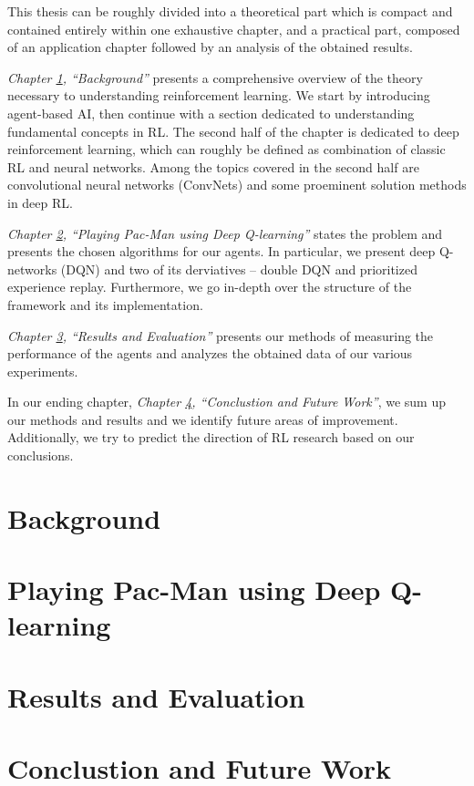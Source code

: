 \documentclass[12pt,twoside]{report}
\begin{document}
This thesis can be roughly divided into a theoretical part which is compact and contained entirely within one exhaustive chapter, and a practical part, composed of an application chapter followed by an analysis of the obtained results.

\emph{Chapter \ref{chapter:background}, ``Background''} presents a comprehensive overview of the theory necessary to understanding reinforcement learning.
We start by introducing agent-based AI, then continue with a
section dedicated to understanding fundamental concepts in RL.
The second half of the chapter is dedicated to deep reinforcement learning, which can roughly be defined as combination of classic RL and neural networks.
Among the topics covered in the second half are convolutional neural networks (ConvNets) and some proeminent solution methods in deep RL.

\emph{Chapter \ref{chapter:practical}, ``Playing Pac-Man using Deep Q-learning''} states the problem and presents the chosen algorithms for our agents.
In particular, we present deep Q-networks (DQN) and two of its derviatives -- double DQN and prioritized experience replay.
Furthermore, we go in-depth over the structure of the framework and its implementation.

\emph{Chapter \ref{chapter:results}, ``Results and Evaluation''} presents our methods of measuring the performance of the agents and analyzes the obtained data of our various experiments.

In our ending chapter, \emph{Chapter \ref{chapter:conclusion}, ``Conclustion and Future Work''}, we sum up our methods and results and we identify future areas of improvement. Additionally, we try to predict the direction of RL research based on our conclusions.

\chapter{Background} \label{chapter:background}


\chapter{Playing Pac-Man using Deep Q-learning} \label{chapter:practical}


\chapter{Results and Evaluation} \label{chapter:results}


\chapter{Conclustion and Future Work} \label{chapter:conclusion}



\end{document}
